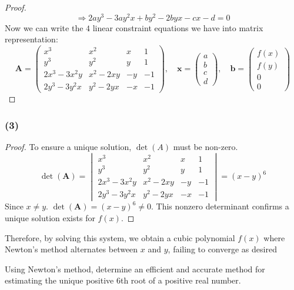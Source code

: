 \documentclass{article}
\begin{document}
\begin{proof}
    \[ \Rightarrow 2ay^3 - 3ay^2x + by^2 - 2byx - cx - d = 0 \]
    Now we can write the $4$ linear constraint equations we have into matrix representation:
    \[
        \mathbf{A} = \begin{pmatrix}
            x^3 & x^2 & x & 1 \\
            y^3 & y^2 & y & 1 \\
            2x^3 - 3x^2y & x^2 - 2xy & -y & -1 \\
            2y^3 - 3y^2x & y^2 - 2yx & -x & -1
        \end{pmatrix},
        \quad
        \mathbf{x} = \begin{pmatrix}
            a \\
            b \\
            c \\
            d
        \end{pmatrix},
        \quad
        \mathbf{b} = \begin{pmatrix}
            f(x) \\
            f(y) \\
            0 \\
            0
        \end{pmatrix}
    \]
\end{proof}

\subsubsection*{(3)}
\begin{proof}
    To ensure a unique solution, $\det(A)$ must be non-zero.
    \[
        \det(\mathbf{A}) = \begin{vmatrix}
            x^3 & x^2 & x & 1 \\
            y^3 & y^2 & y & 1 \\
            2x^3 - 3x^2y & x^2 - 2xy & -y & -1 \\
            2y^3 - 3y^2x & y^2 - 2yx & -x & -1
        \end{vmatrix} = (x - y)^6
    \]
    Since $x \neq y$. \( \det(\mathbf{A}) = (x - y)^6 \neq 0 \). This nonzero determinant confirms a unique solution exists for $f(x)$.
\end{proof}
\noindent Therefore, by solving this system, we obtain a cubic polynomial $f(x)$ where Newton's method alternates between $x$ and $y$, failing to converge as desired

\begin{problem}
    Using Newton's method, determine an efficient and accurate method for estimating the unique positive \(6\)th root of a positive real number.
\end{problem}
\end{document}
